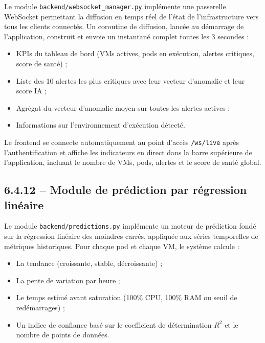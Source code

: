 \documentclass[11pt,a4paper]{report}
\begin{document}
Le module \texttt{backend/websocket\_manager.py} implémente une passerelle
WebSocket permettant la diffusion en temps réel de l'état de l'infrastructure
vers tous les clients connectés. Un coroutine de diffusion, lancée au
démarrage de l'application, construit et envoie un instantané complet toutes
les 3 secondes :

\begin{itemize}[label=\textbullet, leftmargin=1.5cm, labelsep=0.5cm,
                itemsep=0.1em, parsep=0em, topsep=0.2em]
    \item KPIs du tableau de bord (VMs actives, pods en exécution, alertes
    critiques, score de santé) ;
    \item Liste des 10 alertes les plus critiques avec leur vecteur d'anomalie
    et leur score IA ;
    \item Agrégat du vecteur d'anomalie moyen sur toutes les alertes actives ;
    \item Informations sur l'environnement d'exécution détecté.
\end{itemize}

Le frontend se connecte automatiquement au point d'accès \texttt{/ws/live}
après l'authentification et affiche les indicateurs en direct dans la barre
supérieure de l'application, incluant le nombre de VMs, pods, alertes et le
score de santé global.

\subsection*{6.4.12 -- Module de prédiction par régression linéaire}

Le module \texttt{backend/predictions.py} implémente un moteur de prédiction
fondé sur la régression linéaire des moindres carrés, appliquée aux séries
temporelles de métriques historiques. Pour chaque pod et chaque VM, le
système calcule :

\begin{itemize}[label=\textbullet, leftmargin=1.5cm, labelsep=0.5cm,
                itemsep=0.1em, parsep=0em, topsep=0.2em]
    \item La tendance (croissante, stable, décroissante) ;
    \item La pente de variation par heure ;
    \item Le temps estimé avant saturation (100\% CPU, 100\% RAM ou seuil de
    redémarrages) ;
    \item Un indice de confiance basé sur le coefficient de détermination
    $R^2$ et le nombre de points de données.
\end{itemize}
\end{document}
